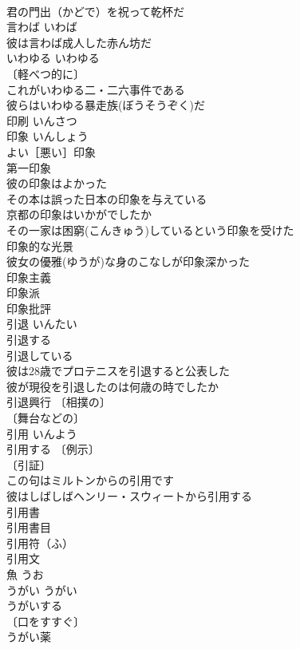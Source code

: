 \documentclass[8pt]{extreport}
\begin{document}
\begin{CJK}{UTF8}{min}
\\	君の門出（かどで）を祝って乾杯だ 
\\	言わば	いわば	
\\	彼は言わば成人した赤ん坊だ 
\\	いわゆる	いわゆる	
\\	〔軽べつ的に〕
\\	これがいわゆる二・二六事件である 
\\	彼らはいわゆる暴走族(ぼうそうぞく)だ 
\\	印刷	いんさつ	
\\	印象	いんしょう	
\\	よい［悪い］印象 
\\	第一印象 
\\	彼の印象はよかった 
\\	その本は誤った日本の印象を与えている 
\\	京都の印象はいかがでしたか 
\\	その一家は困窮(こんきゅう)しているという印象を受けた 
\\	印象的な光景 
\\	彼女の優雅(ゆうが)な身のこなしが印象深かった 
\\	印象主義 
\\	印象派 
\\	印象批評 
\\	引退	いんたい	
\\	引退する 
\\	引退している 
\\	彼は28歳でプロテニスを引退すると公表した 
\\	彼が現役を引退したのは何歳の時でしたか 
\\	引退興行 〔相撲の〕
\\	〔舞台などの〕
\\	引用	いんよう	
\\	引用する 〔例示〕
\\	〔引証〕
\\	この句はミルトンからの引用です 
\\	彼はしばしばヘンリー・スウィートから引用する 
\\	引用書 
\\	引用書目 
\\	引用符（ふ） 
\\	引用文 
\\	魚	うお	
\\	うがい	うがい	
\\	うがいする 
\\	〔口をすすぐ〕
\\	うがい薬 

\end{CJK}
\end{document}
